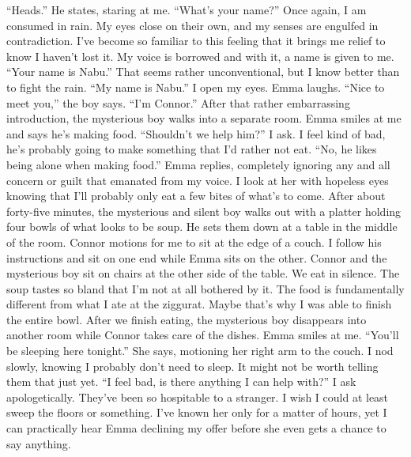 \documentclass[openany, 12pt]{book}
\newcommand\tab[1][1cm]{\hspace*{#1}}
\begin{document}
\tab
``Heads.'' He states, staring at me. ``What’s your name?''\newline
\tab
Once again, I am consumed in rain. My eyes close on their own, and my senses are engulfed in contradiction. I’ve become so familiar to this feeling that it brings me relief to know I haven’t lost it. My voice is borrowed and with it, a name is given to me. ``Your name is Nabu.'' That seems rather unconventional, but I know better than to fight the rain. ``My name is Nabu.'' I open my eyes. Emma laughs.\newline
\tab
``Nice to meet you,'' the boy says. ``I’m Connor.''\newline
\newline
\tab
After that rather embarrassing introduction, the mysterious boy walks into a separate room. Emma smiles at me and says he’s making food.\newline
\tab
``Shouldn’t we help him?'' I ask. I feel kind of bad, he’s probably going to make something that I’d rather not eat.\newline
\tab
``No, he likes being alone when making food.'' Emma replies, completely ignoring any and all concern or guilt that emanated from my voice. I look at her with hopeless eyes knowing that I’ll probably only eat a few bites of what’s to come.\newline
\tab
After about forty-five minutes, the mysterious and silent boy walks out with a platter holding four bowls of what looks to be soup. He sets them down at a table in the middle of the room. Connor motions for me to sit at the edge of a couch. I follow his instructions and sit on one end while Emma sits on the other. Connor and the mysterious boy sit on chairs at the other side of the table.\newline
\tab
We eat in silence. The soup tastes so bland that I’m not at all bothered by it. The food is fundamentally different from what I ate at the ziggurat. Maybe that’s why I was able to finish the entire bowl. After we finish eating, the mysterious boy disappears into another room while Connor takes care of the dishes. Emma smiles at me. ``You’ll be sleeping here tonight.'' She says, motioning her right arm to the couch. I nod slowly, knowing I probably don’t need to sleep. It might not be worth telling them that just yet.\newline
\tab
``I feel bad, is there anything I can help with?'' I ask apologetically. They’ve been so hospitable to a stranger. I wish I could at least sweep the floors or something. I've known her only for a matter of hours, yet I can practically hear Emma declining my offer before she even gets a chance to say anything.\newline
\end{document}
